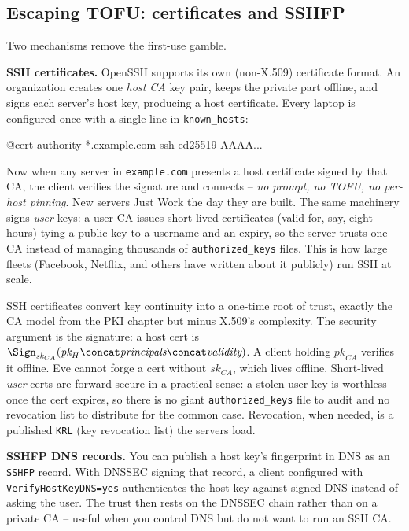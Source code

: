 \subsection{Escaping TOFU: certificates and SSHFP}

Two mechanisms remove the first-use gamble.

\textbf{SSH certificates.} OpenSSH supports its own (non-X.509) certificate format. An organization creates one \emph{host CA} key pair, keeps the private part offline, and signs each server's host key, producing a host certificate. Every laptop is configured once with a single line in \texttt{known\_hosts}:

\begin{center}\ttfamily @cert-authority *.example.com ssh-ed25519 AAAA...\end{center}

Now when any server in \texttt{example.com} presents a host certificate signed by that CA, the client verifies the signature and connects -- \emph{no prompt, no TOFU, no per-host pinning}. New servers Just Work the day they are built. The same machinery signs \emph{user} keys: a user CA issues short-lived certificates (valid for, say, eight hours) tying a public key to a username and an expiry, so the server trusts one CA instead of managing thousands of \texttt{authorized\_keys} files. This is how large fleets (Facebook, Netflix, and others have written about it publicly) run SSH at scale.

\begin{whybox}
SSH certificates convert key continuity into a one-time root of trust, exactly the CA model from the PKI chapter but minus X.509's complexity. The security argument is the signature: a host cert is $\Sign_{\textit{sk}_{CA}}(\textit{pk}_H \concat \textit{principals} \concat \textit{validity})$. A client holding $\textit{pk}_{CA}$ verifies it offline. Eve cannot forge a cert without $\textit{sk}_{CA}$, which lives offline. Short-lived \emph{user} certs are forward-secure in a practical sense: a stolen user key is worthless once the cert expires, so there is no giant \texttt{authorized\_keys} file to audit and no revocation list to distribute for the common case. Revocation, when needed, is a published \texttt{KRL} (key revocation list) the servers load.
\end{whybox}

\textbf{SSHFP DNS records.} You can publish a host key's fingerprint in DNS as an \texttt{SSHFP} record. With DNSSEC signing that record, a client configured with \texttt{VerifyHostKeyDNS=yes} authenticates the host key against signed DNS instead of asking the user. The trust then rests on the DNSSEC chain rather than on a private CA -- useful when you control DNS but do not want to run an SSH CA.

